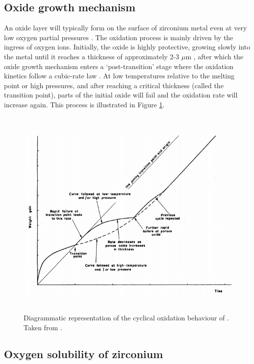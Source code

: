 \subsection{Oxide growth mechanism}

An oxide layer will typically form on the surface of zirconium metal even at very low oxygen partial pressures \cite{causey2005review}. The oxidation process is mainly driven by the ingress of oxygen ions. Initially, the oxide is highly protective, growing slowly into the metal until it reaches a thickness of approximately 2-3 $\mu$m \cite{garzarolli1991oxide, dawson1968kinetics}, after which the oxide growth mechanism enters a `post-transition' stage where the oxidation kinetics follow a cubic-rate law  \cite{porte1960oxidation}. At low temperatures relative to the melting point or high pressures, and after reaching a critical thickness (called the transition point), parts of the initial oxide will fail and the oxidation rate will increase again. This process is illustrated in Figure \ref{figure:oxide_weight_gain}. 

\begin{figure}[ht]
\centering
\includegraphics[height=10.5cm]{images/zro2_oxide_weight_gain.png}
\caption[Diagrammatic representation of the cyclical oxidation behaviour of \zirconia .]{Diagrammatic representation of the cyclical oxidation behaviour of \zirconia . Taken from \cite{cox1963some}.}
\label{figure:oxide_weight_gain}
\end{figure}

\subsection{Oxygen solubility of zirconium}

